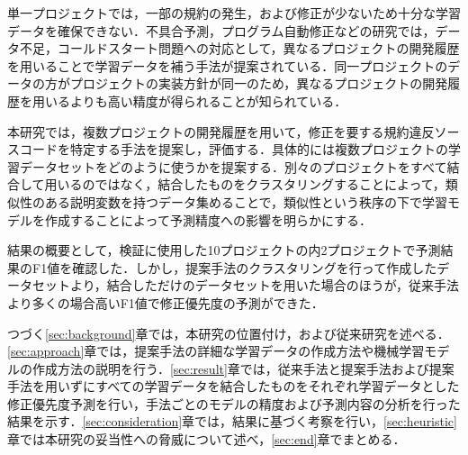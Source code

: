 \documentclass[T,J]{fose} %
\begin{document}
単一プロジェクトでは，一部の規約の発生，および修正が少ないため十分な学習データを確保できない．不具合予測，プログラム自動修正などの研究では，データ不足，コールドスタート問題への対応として，異なるプロジェクトの開発履歴を用いることで学習データを補う手法が提案されている．同一プロジェクトのデータの方がプロジェクトの実装方針が同一のため，異なるプロジェクトの開発履歴を用いるよりも高い精度が得られることが知られている．

本研究では，複数プロジェクトの開発履歴を用いて，修正を要する規約違反ソースコードを特定する手法を提案し，評価する．具体的には複数プロジェクトの学習データセットをどのように使うかを提案する．別々のプロジェクトをすべて結合して用いるのではなく，結合したものをクラスタリングすることによって，類似性のある説明変数を持つデータ集めることで，類似性という秩序の下で学習モデルを作成することによって予測精度への影響を明らかにする．

結果の概要として，検証に使用した10プロジェクトの内2プロジェクトで予測結果のF1値を確認した．しかし，提案手法のクラスタリングを行って作成したデータセットより，結合しただけのデータセットを用いた場合のほうが，従来手法より多くの場合高いF1値で修正優先度の予測ができた．

つづく\ref{sec:background}章では，本研究の位置付け，および従来研究を述べる．\ref{sec:approach}章では，提案手法の詳細な学習データの作成方法や機械学習モデルの作成方法の説明を行う．\ref{sec:result}章では，従来手法と提案手法および提案手法を用いずにすべての学習データを結合したものをそれぞれ学習データとした修正優先度予測を行い，手法ごとのモデルの精度および予測内容の分析を行った結果を示す．\ref{sec:consideration}章では，結果に基づく考察を行い，\ref{sec:heuristic}章では本研究の妥当性への脅威について述べ，\ref{sec:end}章でまとめる．



\end{document}
